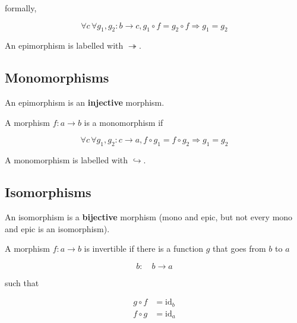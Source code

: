 \documentclass{article}
\begin{document}
\begin{center}
\end{center}

formally,

\[
    \forall c\, \forall g_1, g_2 : b \rightarrow c, g_1 \circ f = g_2 \circ f \Rightarrow g_1 = g_2
\]

An epimorphism is labelled with \(\twoheadrightarrow\).

\subsection{Monomorphisms}

An epimorphism is an \textbf{injective} morphism.


A morphism \(f: a \rightarrow b\) is a monomorphism if

\[
    \forall c\, \forall g_1, g_2: c \rightarrow a, 
    f \circ g_1 = f \circ g_2 \Rightarrow g_1 = g_2
\]

A monomorphism is labelled with \(\hookrightarrow\).

\subsection{Isomorphisms}

An isomorphism is a \textbf{bijective} morphism (mono and epic, but not every mono and epic
is an isomorphism).

A morphism \(f: a \rightarrow b\) is invertible if there
is a function \(g\) that goes from \(b\) to \(a\)

\[
    b:\quad b \rightarrow a
\]

such that

\begin{align*}
    g \circ f &= \text{id}_b
    \\
    f \circ g &= \text{id}_a
\end{align*}

\begin{center}
\end{center}
\end{document}
